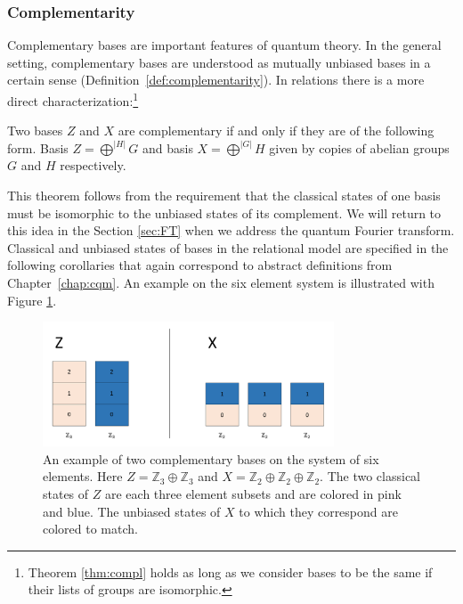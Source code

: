 \subsubsection*{Complementarity}
Complementary bases are important features of quantum theory. In the general setting, complementary bases are understood as mutually unbiased bases in a certain sense (Definition~\ref{def:complementarity}).  In relations there is a more direct characterization:\footnote{Theorem \ref{thm:compl} holds as long as we consider bases to be the same if their lists of groups are isomorphic.}
\begin{theorem}
\label{thm:compl}
Two bases $Z$ and $X$ are complementary if and only if they are of the following form. Basis $Z = \bigoplus^{|H|}G$ and basis $X = \bigoplus^{|G|}H$ given by copies of abelian groups $G$ and $H$ respectively.
\end{theorem}

This theorem follows from the requirement that the classical states of one basis must be isomorphic to the unbiased states of its complement. We will return to this idea in the Section \ref{sec:FT} when we address the quantum Fourier transform. Classical and unbiased states of bases in the relational model are specified in the following corollaries that again correspond to abstract definitions from Chapter~\ref{chap:cqm}. An example on the six element system is illustrated with Figure \ref{complEx}.

\begin{figure}[tb]
\begin{center}
\includegraphics[height=10em,natwidth=1091,natheight=468,scale=1]{images/complexample.png}
\end{center}
\vspace{-14pt}
\caption[An example of two complementary bases on the system of six elements.]{An example of two complementary bases on the system of six elements. Here $Z=\mathbb{Z}_3\oplus\mathbb{Z}_3$ and $X = \mathbb{Z}_2\oplus\mathbb{Z}_2\oplus \mathbb{Z}_2$.  The two classical states of $Z$ are each three element subsets and are colored in pink and blue. The unbiased states of $X$ to which they correspond are colored to match.
}
\label{complEx}
\end{figure}

